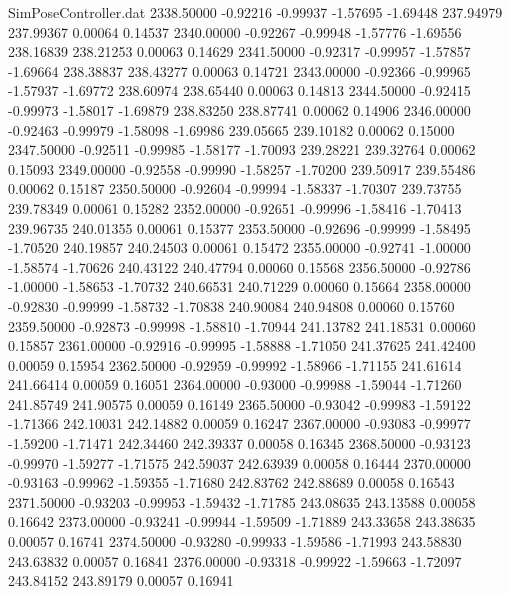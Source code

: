 \begin{filecontents}{SimPoseController.dat}
2338.50000   -0.92216   -0.99937    -1.57695   -1.69448  237.94979  237.99367    0.00064    0.14537
2340.00000   -0.92267   -0.99948    -1.57776   -1.69556  238.16839  238.21253    0.00063    0.14629
2341.50000   -0.92317   -0.99957    -1.57857   -1.69664  238.38837  238.43277    0.00063    0.14721
2343.00000   -0.92366   -0.99965    -1.57937   -1.69772  238.60974  238.65440    0.00063    0.14813
2344.50000   -0.92415   -0.99973    -1.58017   -1.69879  238.83250  238.87741    0.00062    0.14906
2346.00000   -0.92463   -0.99979    -1.58098   -1.69986  239.05665  239.10182    0.00062    0.15000
2347.50000   -0.92511   -0.99985    -1.58177   -1.70093  239.28221  239.32764    0.00062    0.15093
2349.00000   -0.92558   -0.99990    -1.58257   -1.70200  239.50917  239.55486    0.00062    0.15187
2350.50000   -0.92604   -0.99994    -1.58337   -1.70307  239.73755  239.78349    0.00061    0.15282
2352.00000   -0.92651   -0.99996    -1.58416   -1.70413  239.96735  240.01355    0.00061    0.15377
2353.50000   -0.92696   -0.99999    -1.58495   -1.70520  240.19857  240.24503    0.00061    0.15472
2355.00000   -0.92741   -1.00000    -1.58574   -1.70626  240.43122  240.47794    0.00060    0.15568
2356.50000   -0.92786   -1.00000    -1.58653   -1.70732  240.66531  240.71229    0.00060    0.15664
2358.00000   -0.92830   -0.99999    -1.58732   -1.70838  240.90084  240.94808    0.00060    0.15760
2359.50000   -0.92873   -0.99998    -1.58810   -1.70944  241.13782  241.18531    0.00060    0.15857
2361.00000   -0.92916   -0.99995    -1.58888   -1.71050  241.37625  241.42400    0.00059    0.15954
2362.50000   -0.92959   -0.99992    -1.58966   -1.71155  241.61614  241.66414    0.00059    0.16051
2364.00000   -0.93000   -0.99988    -1.59044   -1.71260  241.85749  241.90575    0.00059    0.16149
2365.50000   -0.93042   -0.99983    -1.59122   -1.71366  242.10031  242.14882    0.00059    0.16247
2367.00000   -0.93083   -0.99977    -1.59200   -1.71471  242.34460  242.39337    0.00058    0.16345
2368.50000   -0.93123   -0.99970    -1.59277   -1.71575  242.59037  242.63939    0.00058    0.16444
2370.00000   -0.93163   -0.99962    -1.59355   -1.71680  242.83762  242.88689    0.00058    0.16543
2371.50000   -0.93203   -0.99953    -1.59432   -1.71785  243.08635  243.13588    0.00058    0.16642
2373.00000   -0.93241   -0.99944    -1.59509   -1.71889  243.33658  243.38635    0.00057    0.16741
2374.50000   -0.93280   -0.99933    -1.59586   -1.71993  243.58830  243.63832    0.00057    0.16841
2376.00000   -0.93318   -0.99922    -1.59663   -1.72097  243.84152  243.89179    0.00057    0.16941

\end{filecontents}
